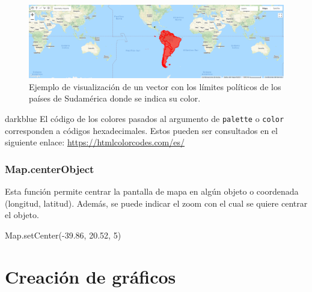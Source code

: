 \documentclass[
  12pt,
  letterpaper,
  twoside]{book}
\newenvironment{Shaded}{\begin{snugshade}}{\end{snugshade}}
\newcommand{\DecValTok}[1]{\textcolor[rgb]{0.28,0.53,0.93}{#1}}
\newcommand{\FloatTok}[1]{\textcolor[rgb]{0.28,0.53,0.93}{#1}}
\newcommand{\FunctionTok}[1]{\textcolor[rgb]{0.48,0.12,0.64}{#1}}
\newcommand{\KeywordTok}[1]{\textcolor[rgb]{0.48,0.12,0.64}{#1}}
\newcommand{\NormalTok}[1]{#1}
\newcommand{\OperatorTok}[1]{\textcolor[rgb]{0.00,0.00,0.00}{#1}}
\begin{document}
\begin{figure}[H]

{\centering \includegraphics[width=0.95\linewidth]{Img/SAmerica} 

}

\caption{Ejemplo de visualización de un vector con los límites políticos de los países de Sudamérica donde se indica su color.}\label{fig:f33}
\end{figure}

\begin{bluebox2}

\begin{awesomeblock}{5pt}{\faLightbulb}{darkblue}
El código de los colores pasados al argumento de \texttt{palette} o \texttt{color} corresponden a códigos hexadecimales. Estos pueden ser consultados en el siguiente enlace: \url{https://htmlcolorcodes.com/es/}

\end{awesomeblock}

\end{bluebox2}

\hypertarget{map.centerobject}{%
\subsubsection*{Map.centerObject}\label{map.centerobject}}

Esta función permite centrar la pantalla de mapa en algún objeto o coordenada (longitud, latitud). Además, se puede indicar el zoom con el cual se quiere centrar el objeto.

\begin{Shaded}
\begin{Highlighting}[]
\KeywordTok{Map}\OperatorTok{.}\FunctionTok{setCenter}\NormalTok{(}\OperatorTok{{-}}\FloatTok{39.86}\OperatorTok{,} \FloatTok{20.52}\OperatorTok{,} \DecValTok{5}\NormalTok{)}
\end{Highlighting}
\end{Shaded}

\hypertarget{creaciuxf3n-de-gruxe1ficos}{%
\section{Creación de gráficos}\label{creaciuxf3n-de-gruxe1ficos}}
\end{document}
